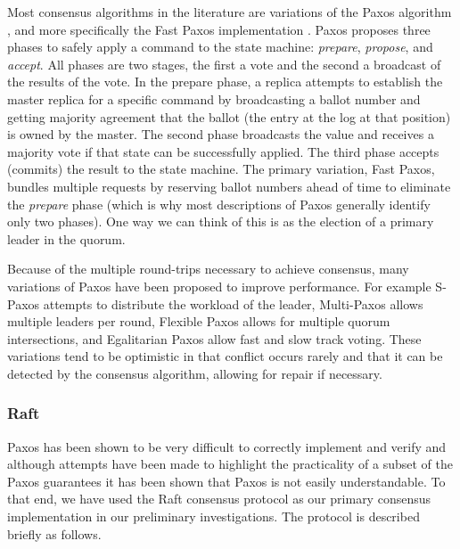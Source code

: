 \documentclass{article}
\begin{document}
Most consensus algorithms in the literature are variations of the Paxos algorithm \cite{lamport_paxos_2001}, and more specifically the Fast Paxos implementation \cite{lamport_fast_2006}. Paxos proposes three phases to safely apply a command to the state machine: \textit{prepare}, \textit{propose}, and \textit{accept}. All phases are two stages, the first a vote and the second a broadcast of the results of the vote. In the prepare phase, a replica attempts to establish the master replica for a specific command by broadcasting a ballot number and getting majority agreement that the ballot (the entry at the log at that position) is owned by the master. The second phase broadcasts the value and receives a majority vote if that state can be successfully applied. The third phase accepts (commits) the result to the state machine. The primary variation, Fast Paxos, bundles multiple requests by reserving ballot numbers ahead of time to eliminate the \textit{prepare} phase (which is why most descriptions of Paxos generally identify only two phases). One way we can think of this is as the election of a primary leader in the quorum.

Because of the multiple round-trips necessary to achieve consensus, many variations of Paxos have been proposed to improve performance. For example S-Paxos \cite{biely_s-paxos:_2012} attempts to distribute the workload of the leader, Multi-Paxos \cite{camargos_multicoordinated_2007} allows multiple leaders per round, Flexible Paxos \cite{2016arXiv160806696H} allows for multiple quorum intersections, and Egalitarian Paxos \cite{moraru_egalitarian_2012,moraru_there_2013} allow fast and slow track voting. These variations tend to be optimistic in that conflict occurs rarely and that it can be detected by the consensus algorithm, allowing for repair if necessary.

\subsubsection{Raft}
\label{sec:raft}

Paxos has been shown to be very difficult to correctly implement and verify \cite{chandra_paxos_2007} and although attempts have been made to highlight the practicality of a subset of the Paxos guarantees \cite{mazieres_paxos_2007} it has been shown that Paxos is not easily understandable. To that end, we have used the Raft consensus protocol \cite{ongaro_search_2014,howard_raft_2015} as our primary consensus implementation in our preliminary investigations. The protocol is described briefly as follows.
\end{document}
